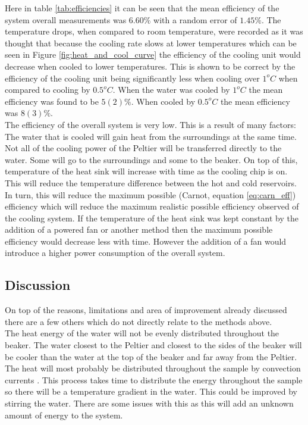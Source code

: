 \documentclass[10pt]{article}
\begin{document}
Here in table \ref{tab:efficiencies} it can be seen that the mean efficiency of the system overall measurements was $6.60\%$ with a random error of $1.45\%$. The temperature drops, when compared to room temperature, were recorded as it was thought that because the cooling rate slows at lower temperatures which can be seen in Figure \ref{fig:heat_and_cool_curve} the efficiency of the cooling unit would decrease when cooled to lower temperatures. This is shown to be correct by the efficiency of the cooling unit being significantly less when cooling over $1^oC$ when compared to cooling by $0.5^oC$. When the water was cooled by $1^oC$ the mean efficiency was found to be $5(2)\%$. When cooled by $0.5^oC$ the mean efficiency was $8(3)\%$.\\

The efficiency of the overall system is very low. This is a result of many factors: The water that is cooled will gain heat from the surroundings at the same time. Not all of the cooling power of the Peltier will be transferred directly to the water. Some will go to the surroundings and some to the beaker. On top of this, temperature of the heat sink will increase with time as the cooling chip is on. This will reduce the temperature difference between the hot and cold reservoirs. In turn, this will reduce the maximum possible (Carnot, equation \ref{eq:carn_eff}) efficiency which will reduce the maximum realistic possible efficiency observed of the cooling system. If the temperature of the heat sink was kept constant by the addition of a powered fan or another method then the maximum possible efficiency would decrease less with time. However the addition of a fan would introduce a higher power consumption of the overall system. 


\subsection*{Discussion}
On top of the reasons, limitations and area of improvement already discussed there are a few others which do not directly relate to the methods above.\\

The heat energy of the water will not be evenly distributed throughout the beaker. The water closest to the Peltier and closest to the sides of the beaker will be cooler than the water at the top of the beaker and far away from the Peltier. The heat will most probably be distributed throughout the sample by convection currents \cite{conv_cur}. This process takes time to distribute the energy throughout the sample so there will be a temperature gradient in the water. This could be improved by stirring the water. There are some issues with this as this will add an unknown amount of energy to the system.\\
\end{document}
